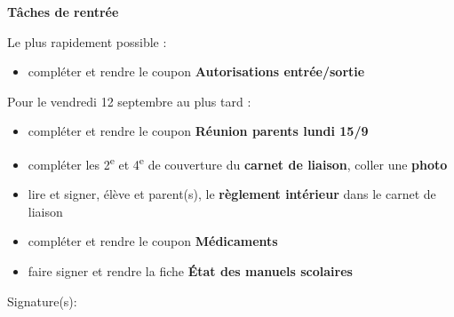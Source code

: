\documentclass[10pt,a5paper]{article}
\begin{document}
\PfCPanneaux[FeuTricolore]
\begin{tcolorbox}[colback=teal!10!white, colframe=teal!80!black]
\begin{center}
\large\textbf{Tâches de rentrée}
\end{center}
\end{tcolorbox}

\vspace{0.6em}
Le plus rapidement possible :

\begin{itemize}[leftmargin=1.5em, label=$\square$]
    \item compléter et rendre le coupon \textbf{Autorisations entrée/sortie}
\end{itemize}

\vspace{0.6em}
Pour le vendredi 12 septembre au plus tard :
\begin{itemize}[leftmargin=1.5em, label=$\square$]
\item  compléter et rendre le coupon \textbf{Réunion parents lundi 15/9}
\item  compléter les 2\textsuperscript{e} et 4\textsuperscript{e} de couverture du \textbf{carnet de liaison}, coller une \textbf{photo}
\item  lire et signer, élève et parent(s), le \textbf{règlement intérieur} dans le carnet de liaison
\item  compléter et rendre le coupon \textbf{Médicaments}
\item  faire signer et rendre la fiche \textbf{État des manuels scolaires}
\end{itemize}
\vspace{1em}
Signature(s):
\end{document}
